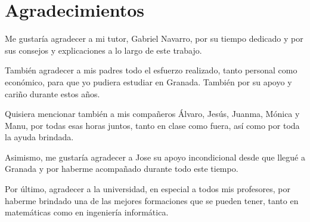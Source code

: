 

\chapter*{Agradecimientos}
\thispagestyle{empty}

Me gustaría agradecer a mi tutor, Gabriel Navarro, por su tiempo dedicado y por sus consejos y explicaciones a lo largo de este trabajo.

También agradecer a mis padres todo el esfuerzo realizado, tanto personal como económico, para que yo pudiera estudiar en Granada. También por su apoyo y cariño durante estos años.

Quisiera mencionar también a mis compañeros Álvaro, Jesús, Juanma, Mónica y Manu, por todas esas horas juntos, tanto en clase como fuera, así como por toda la ayuda brindada.

Asimismo, me gustaría agradecer a Jose su apoyo incondicional desde que llegué a Granada y por haberme acompañado durante todo este tiempo.

Por último, agradecer a la universidad, en especial a todos mis profesores, por haberme brindado una de las mejores formaciones que se pueden tener, tanto en matemáticas como en ingeniería informática.

\cleardoublepage
\newpage
